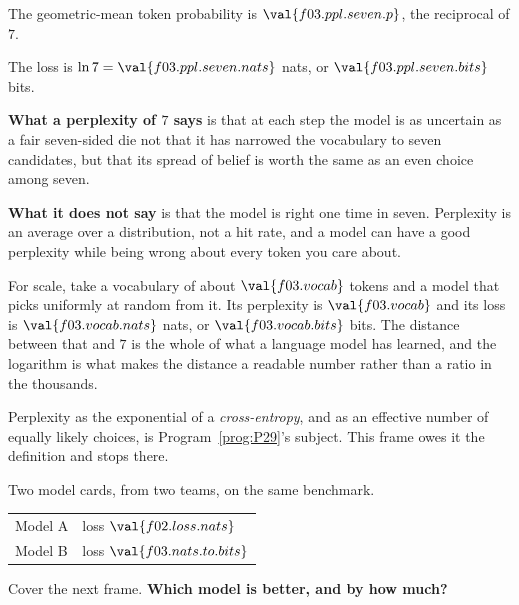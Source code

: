 \begin{fr}
\begin{ansblock}
The geometric-mean token probability is $\val{f03.ppl.seven.p}$, the reciprocal
of $7$.

The loss is $\ln 7 = \val{f03.ppl.seven.nats}$ nats, or
$\val{f03.ppl.seven.bits}$ bits.
\end{ansblock}

\textbf{What a perplexity of $7$ says} is that at each step the model is as
uncertain as a fair seven-sided die \dash{} not that it has narrowed the
vocabulary to seven candidates, but that its spread of belief is worth the same
as an even choice among seven.

\textbf{What it does not say} is that the model is right one time in seven.
Perplexity is an average over a distribution, not a hit rate, and a model can
have a good perplexity while being wrong about every token you care about.

For scale, take a vocabulary of about $\val{f03.vocab}$ tokens and a model that
picks uniformly at random from it. Its perplexity is $\val{f03.vocab}$ and its
loss is $\val{f03.vocab.nats}$ nats, or $\val{f03.vocab.bits}$ bits. The
distance between that and $7$ is the whole of what a language model has
learned, and the logarithm is what makes the distance a readable number rather
than a ratio in the thousands.

Perplexity as the exponential of a \emph{cross-entropy}, and as an effective
number of equally likely choices, is Program~\ref{prog:P29}'s subject. This
frame owes it the definition and stops there.
\end{fr}

\begin{fr}
Two model cards, from two teams, on the same benchmark.

\begin{center}
\begin{tabular}{ll}
\toprule
Model A & loss $\val{f02.loss.nats}$ \\
Model B & loss $\val{f03.nats.to.bits}$ \\
\bottomrule
\end{tabular}
\end{center}

Cover the next frame. \textbf{Which model is better, and by how much?}
\dotline
\nextframe
\end{fr}

